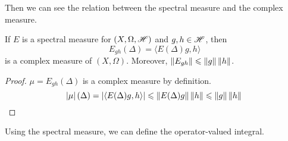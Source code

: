 \documentclass[a4paper,11pt]{report}
\begin{document}
Then we can see the relation between the spectral measure and the complex measure.
\begin{prop}
	If $E$ is a spectral measure for $(X,\Omega,\mathscr{H})$ and $g,h \in \mathscr{H}$, then
	\begin{equation*}
		E_{gh}(\Delta) = \langle E(\Delta)g, h \rangle
	\end{equation*}
	is a complex measure of $(X,\Omega)$. Moreover, $\left\lVert E_{gh}\right\lVert \leqslant \left\lVert g\right\lVert\left\lVert h\right\lVert$.
\end{prop}
\begin{proof}
	$\mu=E_{gh}(\Delta)$ is a complex measure by definition.
	\begin{equation*}
		\left\lvert\mu\right\lvert(\Delta) = \left\lvert\langle E(\Delta)g, h \rangle\right\lvert \leqslant \left\lVert E(\Delta)g\right\lVert\left\lVert h\right\lVert \leqslant \left\lVert g\right\lVert\left\lVert h\right\lVert \qedhere
	\end{equation*}
\end{proof}

Using the spectral measure, we can define the operator-valued integral.
\end{document}
